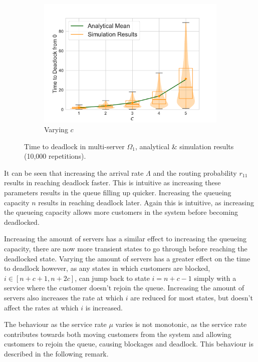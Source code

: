 \documentclass{article}
\numberwithin{equation}{section}
\begin{document}
\begin{figure}[!htbp]
\begin{center}
\begin{subfigure}[b]{0.48\textwidth}
    \includegraphics[width=\textwidth]{images/1Nms_varyc}
    \caption{Varying $c$}
    \label{fig:1Nms_c}
  \end{subfigure}
  \end{center}
  \caption{Time to deadlock in multi-server $\Omega_1$, analytical \&
  simulation results (10,000 repetitions).}
  \label{fig:timestodeadlock1nodemultiserver}
\end{figure}

It can be seen that increasing the arrival rate $\Lambda$ and the routing
probability $r_{11}$ results in reaching deadlock faster.
This is intuitive as increasing these parameters results in the queue filling
up quicker.
Increasing the queueing capacity $n$ results in reaching deadlock later.
Again this is intuitive, as increasing the queueing capacity allows more
customers in the system before becoming deadlocked.

Increasing the amount of servers has a similar effect to increasing the
queueing capacity, there are now more transient states to go through before
reaching the deadlocked state.
Varying the amount of servers has a greater effect on the time to deadlock
however, as any states in which customers are blocked, $i \in [n+c+1, n+2c]$,
can jump back to state $i=n+c-1$ simply with a service where the customer
doesn't rejoin the queue.
Increasing the amount of servers also increases the rate at which $i$ are
reduced for most states, but doesn't affect the rates at which $i$ is
increased.

The behaviour as the service rate $\mu$ varies is not monotonic, as the
service rate contributes towards both moving customers from the system and
allowing customers to rejoin the queue, causing blockages and deadlock.
This behaviour is described in the following remark.\\
\end{document}
